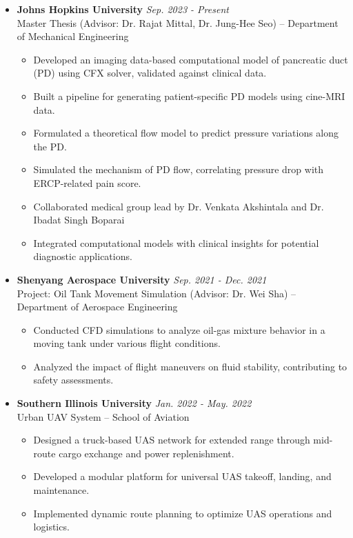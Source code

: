 \documentclass[11pt]{article}
\begin{document}
\begin{itemize}[leftmargin=*,itemsep=1pt]

    \item \textbf{Johns Hopkins University} \hfill \textit{Sep. 2023 - Present} \\
    Master Thesis (Advisor: Dr. Rajat Mittal, Dr. Jung-Hee Seo) – Department of Mechanical Engineering
    \begin{itemize}[leftmargin=*,itemsep=1pt]
        \item Developed an imaging data-based computational model of pancreatic duct (PD) using CFX solver, validated against clinical data.
        \item Built a pipeline for generating patient-specific PD models using cine-MRI data.
        \item Formulated a theoretical flow model to predict pressure variations along the PD.
        \item Simulated the mechanism of PD flow, correlating pressure drop with ERCP-related pain score.
        \item Collaborated medical group lead by Dr. Venkata Akshintala and Dr. Ibadat Singh Boparai 
        \item Integrated computational models with clinical insights for potential diagnostic applications.
    \end{itemize}

    \item \textbf{Shenyang Aerospace University} \hfill \textit{Sep. 2021 - Dec. 2021} \\
    Project: Oil Tank Movement Simulation (Advisor: Dr. Wei Sha) – Department of Aerospace Engineering
    \begin{itemize}[leftmargin=*,itemsep=1pt]
        \item Conducted CFD simulations to analyze oil-gas mixture behavior in a moving tank under various flight conditions.
        \item Analyzed the impact of flight maneuvers on fluid stability, contributing to safety assessments.
    \end{itemize}

    \item \textbf{Southern Illinois University} \hfill \textit{Jan. 2022 - May. 2022} \\
    Urban UAV System – School of Aviation
    \begin{itemize}[leftmargin=*,itemsep=1pt]
        \item Designed a truck-based UAS network for extended range through mid-route cargo exchange and power replenishment.
        \item Developed a modular platform for universal UAS takeoff, landing, and maintenance.
        \item Implemented dynamic route planning to optimize UAS operations and logistics.
    \end{itemize}

\end{itemize}
\end{document}
